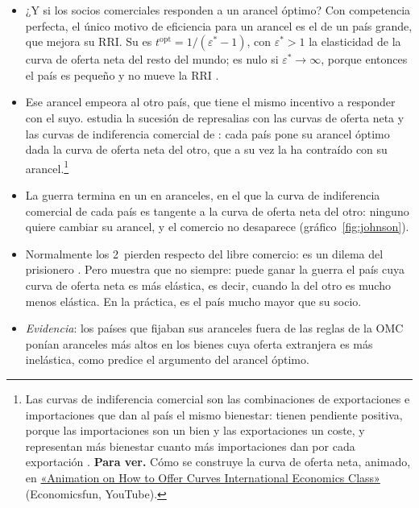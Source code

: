 \documentclass[11pt]{article}
\begin{document}
\begin{itemize}
\item ¿Y si los socios comerciales responden a un arancel óptimo? Con competencia perfecta, el único motivo de eficiencia para un arancel es el de un país grande, que mejora su RRI. Su  es $t^{\mathrm{opt}}=1/(\varepsilon^*-1)$, con $\varepsilon^*>1$ la elasticidad de la curva de oferta neta del resto del mundo; es nulo si $\varepsilon^*\to\infty$, porque entonces el país es pequeño y no mueve la RRI .
\item Ese arancel empeora al otro país, que tiene el mismo incentivo a responder con el suyo. \textcite{Johnson1953Optimum} estudia la sucesión de represalias con las curvas de oferta neta y las curvas de indiferencia comercial de \textcite{Meade1952Geometry} : cada país pone su arancel óptimo dada la curva de oferta neta del otro, que a su vez la ha contraído con su arancel.\footnote{Las curvas de indiferencia comercial son las combinaciones de exportaciones e importaciones que dan al país el mismo bienestar: tienen pendiente positiva, porque las importaciones son un bien y las exportaciones un coste, y representan más bienestar cuanto más importaciones dan por cada exportación . \textbf{Para ver.} Cómo se construye la curva de oferta neta, animado, en \href{https://www.youtube.com/watch?v=avf0o-PzQEA}{«Animation on How to Offer Curves International Economics Class»} (Economicsfun, YouTube).}
\item La guerra termina en un  en aranceles, en el que la curva de indiferencia comercial de cada país es tangente a la curva de oferta neta del otro: ninguno quiere cambiar su arancel, y el comercio no desaparece (gráfico~\ref{fig:johnson}).
\item Normalmente los 2~pierden respecto del libre comercio: es un dilema del prisionero . Pero \textcite{Johnson1953Optimum} muestra que no siempre: puede ganar la guerra el país cuya curva de oferta neta es más elástica, es decir, cuando la del otro es mucho menos elástica. En la práctica, es el país mucho mayor que su socio\nocite{KennanRiezman1988Big}.
\item \emph{Evidencia}: los países que fijaban sus aranceles fuera de las reglas de la OMC ponían aranceles más altos en los bienes cuya oferta extranjera es más inelástica, como predice el argumento del arancel óptimo\nocite{BrodaLimaoWeinstein2008Optimal}.
\end{itemize}
\end{document}
